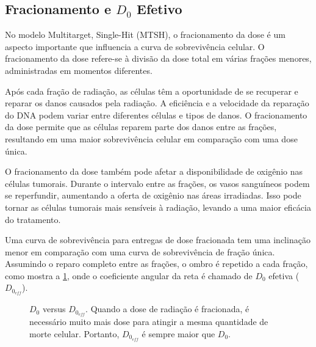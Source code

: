 \documentclass[11pt,a4paper]{article}
\begin{document}
\subsection*{Fracionamento e $D_0$ Efetivo}

	No modelo Multitarget, Single-Hit (MTSH), o fracionamento da dose é um aspecto importante que influencia a curva de sobrevivência celular. O fracionamento da dose refere-se à divisão da dose total em várias frações menores, administradas em momentos diferentes. 

	Após cada fração de radiação, as células têm a oportunidade de se recuperar e reparar os danos causados pela radiação. A eficiência e a velocidade da reparação do DNA podem variar entre diferentes células e tipos de danos. O fracionamento da dose permite que as células reparem parte dos danos entre as frações, resultando em uma maior sobrevivência celular em comparação com uma dose única.

	O fracionamento da dose também pode afetar a disponibilidade de oxigênio nas células tumorais. Durante o intervalo entre as frações, os vasos sanguíneos podem se reperfundir, aumentando a oferta de oxigênio nas áreas irradiadas. Isso pode tornar as células tumorais mais sensíveis à radiação, levando a uma maior eficácia do tratamento.

	Uma curva de sobrevivência para entregas de dose fracionada tem uma inclinação menor em comparação com uma curva de sobrevivência de fração única. Assumindo o reparo completo entre as frações, o ombro é repetido a cada fração, como mostra a \ref{fig:modeloEFracionamento}, onde o coeficiente angular da reta é chamado de $D_0$ efetiva ($D_{0_{eff}}$).

	\begin{figure}[h]
		\centering
		\caption{$D_0$ versus $D_{0_{eff}}$. Quando a dose de radiação é fracionada, é necessário muito mais dose para atingir a mesma quantidade de morte celular. Portanto, $D_{0_{eff}}$ é sempre maior que $D_0$.}
		\label{fig:modeloEFracionamento}
	\end{figure}
\end{document}
